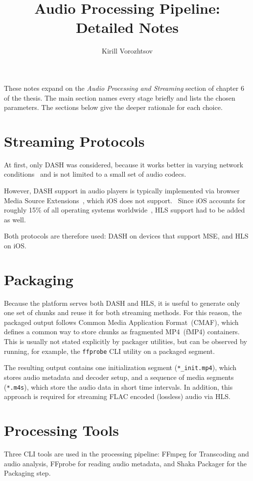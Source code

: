 \documentclass[a4paper,11pt]{article}
\title{Audio Processing Pipeline: Detailed Notes}
\author{Kirill Vorozhtsov}
\date{}
\begin{document}
\maketitle

These notes expand on the \textit{Audio Processing and Streaming} section
of chapter 6 of the thesis. The main section names every stage briefly
and lists the chosen parameters. The sections below give the deeper
rationale for each choice.

\section{Streaming Protocols}
At first, only DASH was considered, because it works better in varying
network conditions~\parencite{hls_vs_dash} and is not limited to a small
set of audio codecs.~\parencite{dash_technical}

However, DASH support in audio players is typically implemented via
browser Media Source Extensions~\parencite{mse}, which iOS does not
support.~\parencite{msecaniuse} Since iOS accounts for roughly 15\% of
all operating systems worldwide~\parencite{os_percentage}, HLS support
had to be added as well.

Both protocols are therefore used: DASH on devices that support MSE,
and HLS on iOS\@.

\section{Packaging}
Because the platform serves both DASH and HLS, it is useful to generate
only one set of chunks and reuse it for both streaming methods. For
this reason, the packaged output follows Common Media Application
Format~(CMAF), which defines a common way to store chunks as fragmented
MP4~(fMP4) containers.~\parencite{cmaf} This is usually not stated
explicitly by packager utilities, but can be observed by running, for
example, the \texttt{ffprobe} CLI utility on a packaged segment.

The resulting output contains one initialization segment
(\texttt{*\_init.mp4}), which stores audio metadata and decoder setup,
and a sequence of media segments (\texttt{*.m4s}), which store the
audio data in short time intervals. In addition, this approach is
required for streaming FLAC encoded (lossless) audio via
HLS\@.~\parencite{apple_hls_specs_flac_container}

\section{Processing Tools}
Three CLI tools are used in the processing pipeline: FFmpeg for
Transcoding and audio analysis, FFprobe for reading audio metadata,
and Shaka Packager for the Packaging step.
\end{document}
